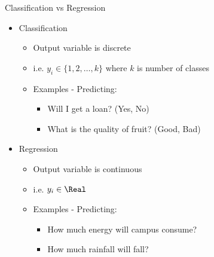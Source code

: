\documentclass[usenames,dvipsnames]{beamer}
\begin{document}
\begin{frame}{Classification vs Regression}
\begin{itemize}
	\item Classification
	\begin{itemize}
		\item \pause Output variable is discrete
		\item \pause i.e.  $y_i \in \{1, 2, \ldots, k\}$ where $k$ is number of classes 
		\item \pause Examples - Predicting: 
		\begin{itemize}
			\item \pause Will I get a loan? (Yes, No)
			\item \pause What is the quality of fruit? (Good, Bad)
		\end{itemize}
	\end{itemize}
	\item \pause Regression
	\begin{itemize}
		\item \pause Output variable is continuous
		\item \pause i.e.  $y_i \in \Real$ 
		\item \pause Examples - Predicting: 
		\begin{itemize}
			\item \pause How much energy will campus consume? 
			\item \pause How much rainfall will fall?
		\end{itemize}
	\end{itemize}
\end{itemize}

\end{frame}
\end{document}

